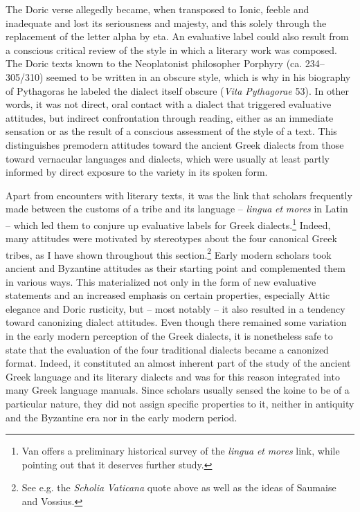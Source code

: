 \documentclass[output=paper]{langsci/langscibook}
\begin{document}
The Doric verse allegedly became, when transposed to Ionic, feeble and inadequate and lost its seriousness and majesty, and this solely through the replacement of the letter alpha by eta. An evaluative label could also result from a conscious critical review of the style in which a literary work was composed. The Doric texts known to the Neoplatonist philosopher Porphyry (ca. 234–305/310) seemed to be written in an obscure style, which is why in his biography of Pythagoras he labeled the dialect itself obscure (\textit{Vita} \textit{Pythagorae} 53). In other words, it was not direct, oral contact with a dialect that triggered evaluative attitudes, but indirect confrontation through reading, either as an immediate sensation or as the result of a conscious assessment of the style of a text. This distinguishes premodern attitudes toward the ancient Greek dialects from those toward vernacular languages and dialects, which were usually at least partly informed by direct exposure to the variety in its spoken form.

Apart from encounters with literary texts, it was the link that scholars frequently made between the customs of a tribe and its language – \textit{lingua} \textit{et} \textit{mores} in Latin – which led them to conjure up evaluative labels for Greek dialects.\footnote{Van \citet{Hal2013} offers a preliminary historical survey of the \textit{lingua} \textit{et} \textit{mores} link, while pointing out that it deserves further study.} Indeed, many attitudes were motivated by stereotypes about the four canonical Greek tribes, as I have shown throughout this section.\footnote{See e.g. the \textit{Scholia} \textit{Vaticana} quote above as well as the ideas of Saumaise and Vossius.} Early modern scholars took ancient and Byzantine attitudes as their starting point and complemented them in various ways. This materialized not only in the form of new evaluative statements and an increased emphasis on certain properties, especially Attic elegance and Doric rusticity, but – most notably – it also resulted in a tendency toward canonizing dialect attitudes. Even though there remained some variation in the early modern perception of the Greek dialects, it is nonetheless safe to state that the evaluation of the four traditional dialects became a canonized format. Indeed, it constituted an almost inherent part of the study of the ancient Greek language and its literary dialects and was for this reason integrated into many Greek language manuals. Since scholars usually sensed the koine to be of a particular nature, they did not assign specific properties to it, neither in antiquity and the Byzantine era nor in the early modern period.
\end{document}
